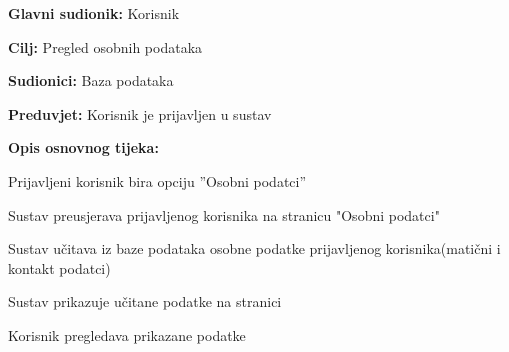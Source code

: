 					\noindent {}
					\begin{packed_item}
	
						\item \textbf{Glavni sudionik: }Korisnik
						\item  \textbf{Cilj:} Pregled osobnih podataka
						\item  \textbf{Sudionici:} Baza podataka
						\item  \textbf{Preduvjet:} Korisnik je prijavljen u sustav
						\item  \textbf{Opis osnovnog tijeka:}
						
						\item[] \begin{packed_enum}
							\item Prijavljeni korisnik bira opciju ”Osobni podatci”
                            \item Sustav preusjerava prijavljenog korisnika na stranicu "Osobni podatci"
                            \item Sustav učitava iz baze podataka osobne podatke prijavljenog korisnika(matični i kontakt podatci)
                            \item Sustav prikazuje učitane podatke na stranici
                            \item Korisnik pregledava prikazane podatke
						\end{packed_enum}
                        
                    \end{packed_item}	
                    
